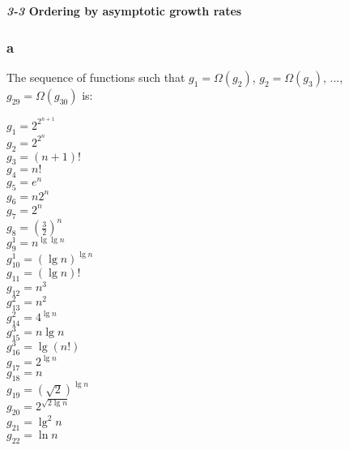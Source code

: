 \documentclass[8pt,a4paper]{article}
\begin{document}
\begin{framed}
  \textbf{\textit{3-3} Ordering by asymptotic growth rates}
\end{framed}

\subsubsection*{a}

  The sequence of functions such that $g_{1} = \Omega(g_{2})$, $g_{2} = \Omega(g_{3})$, ...,
$g_{29} = \Omega(g_{30})$ is:

\begin{multicols}{3}
  \noindent
  $g_{1}      = 2^{2^{n + 1}}$                \\
  $g_{2}      = 2^{2^{n}}$                    \\
  $g_{3}      = (n + 1)!$                     \\
  $g_{4}      = n!$                           \\
  $g_{5}      = e^{n}$                        \\
  $g_{6}      = n2^{n}$                       \\
  $g_{7}      = 2^{n}$                        \\
  $g_{8}      = \left(\frac{3}{2}\right)^{n}$ \\
  $g^{1}_{9}  = n^{\lg \lg n}$                \\
  $g^{1}_{10} = (\lg n)^{\lg n}$              \\
  $g_{11}     = (\lg n)!$                     \\
  $g_{12}     = n^{3}$                        \\
  $g^{2}_{13} = n^{2}$                        \\
  $g^{2}_{14} = 4^{\lg n}$                    \\
  $g^{3}_{15} = n \lg n$                      \\
  $g^{3}_{16} = \lg (n!)$                     \\
  $g_{17}     = 2^{\lg n}$                    \\
  $g_{18}     = n$                            \\
  $g_{19}     = (\sqrt{2})^{\lg n}$              \\
  $g_{20}     = 2^{\sqrt{2 \lg n}}$           \\
  $g_{21}     = \lg^{2} n$                    \\
  $g_{22}     = \ln n$                        \\

\end{multicols}
\end{document}
